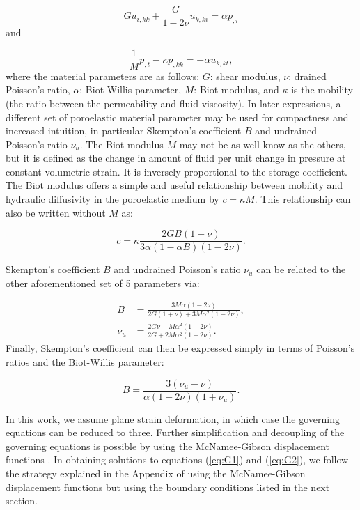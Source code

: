 \documentclass[draft]{agujournal2019}
\begin{document}
\begin{equation}
G  u_{i,kk} + \frac{G}{1-2\nu} u_{k,ki} = \alpha p_{,i}
\label{eq:G1}
\end{equation} 
and

\begin{equation}
\frac{1}{M} p_{,t} - \kappa p_{,kk} = - \alpha u_{k,kt},
\label{eq:G2}
\end{equation}
\noindent
where the material parameters are as follows: $G$: shear modulus, $\nu$: drained Poisson's ratio, $\alpha$: Biot-Willis parameter, $M$: Biot modulus, and $\kappa$ is the mobility  (the ratio between the permeability and fluid viscosity). In later expressions, a different set of poroelastic material parameter may be used for compactness and increased intuition, in particular Skempton's coefficient $B$ and undrained Poisson's ratio $\nu_u$. The Biot modulus $M$ may not be as well know as the others, but it is defined as the change in amount of fluid per unit change in pressure at constant volumetric strain. It is inversely proportional to the storage coefficient. The Biot modulus offers a simple and useful relationship between mobility and hydraulic diffusivity in the poroelastic medium by $c = \kappa M$. This relationship can also be written without $M$ as:

\begin{equation}
c = \kappa \frac{2 G B (1+\nu) }{3 \alpha (1 - \alpha B) (1 - 2 \nu)}.
\label{eq:c(kappa)}
\end{equation}

Skempton's coefficient $B$ and undrained Poisson's ratio $\nu_u$ can be related to the other aforementioned set of 5 parameters via:

\begin{align}
    B & = \frac{3M\alpha(1-2\nu)}{2G(1+\nu) + 3M\alpha^2(1-2\nu)} , \\
    \nu_u & = \frac{2G\nu + M \alpha^2(1-2\nu)}{2G + 2M \alpha^2(1-2\nu)}.
\end{align}
Finally, Skempton's coefficient can then be expressed simply in terms of Poisson's ratios and the Biot-Willis parameter:

\begin{equation}
    B = \frac{3(\nu_u - \nu)}{\alpha (1-2\nu) (1+\nu_u)} .
    \label{eq:B(alpha)}
\end{equation}

In this work, we assume plane strain deformation, in which case the governing equations can be reduced to three. Further simplification and decoupling of the governing equations is possible by using the McNamee-Gibson displacement functions \cite{Mcnamee1960,Verruijt1971}. In obtaining solutions to equations (\ref{eq:G1}) and (\ref{eq:G2}), we follow the strategy explained in the Appendix of  using the McNamee-Gibson displacement functions but using the boundary conditions listed in the next section.
\end{document}
